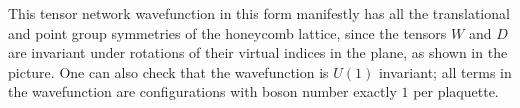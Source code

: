 %
%
%
%

This tensor network wavefunction in this form manifestly has all the translational and point group symmetries of the honeycomb lattice, since the tensors $W$ and $D$ are invariant under rotations of their virtual indices in the plane, as shown in the picture. One can also check that the wavefunction is $U(1)$ invariant; all terms in the wavefunction are configurations with boson number exactly $1$ per plaquette.


